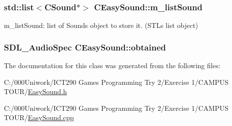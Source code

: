 \subsubsection[{\texorpdfstring{m\+\_\+list\+Sound}{m_listSound}}]{\setlength{\rightskip}{0pt plus 5cm}std\+::list$<${\bf C\+Sound}$\ast$$>$ C\+Easy\+Sound\+::m\+\_\+list\+Sound\hspace{0.3cm}{\ttfamily [private]}}\hypertarget{class_c_easy_sound_ab9462a201705d5314d8672417841f76c}{}\label{class_c_easy_sound_ab9462a201705d5314d8672417841f76c}
m\+\_\+list\+Sound\+: list of Sound\textquotesingle{}s object to store it. (S\+TL\textquotesingle{}s list object) 
\subsubsection[{\texorpdfstring{obtained}{obtained}}]{\setlength{\rightskip}{0pt plus 5cm}S\+D\+L\+\_\+\+Audio\+Spec C\+Easy\+Sound\+::obtained\hspace{0.3cm}{\ttfamily [private]}}\hypertarget{class_c_easy_sound_a1e163bfd31003aed603af84b9464a82c}{}\label{class_c_easy_sound_a1e163bfd31003aed603af84b9464a82c}


The documentation for this class was generated from the following files\+:\begin{DoxyCompactItemize}
\item 
C\+:/000\+Uniwork/\+I\+C\+T290 Games Programming Try 2/\+Exercise 1/\+C\+A\+M\+P\+U\+S T\+O\+U\+R/\hyperlink{_easy_sound_8h}{Easy\+Sound.\+h}\item 
C\+:/000\+Uniwork/\+I\+C\+T290 Games Programming Try 2/\+Exercise 1/\+C\+A\+M\+P\+U\+S T\+O\+U\+R/\hyperlink{_easy_sound_8cpp}{Easy\+Sound.\+cpp}\end{DoxyCompactItemize}
